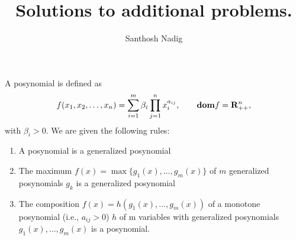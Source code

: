 \documentclass[a4paper,10pt]{article}
\title{Solutions to additional problems.}
\author{Santhosh Nadig}
\def\bR{{\bf R}}
\def\dom{{\bf{dom}}}
\begin{document}
A posynomial is defined as
\begin{align}
f(x_1, x_2,\dots,x_n) = \sum_{i=1}^m \beta_i \prod_{j=1}^n x_i^{a_{ij}}, \qquad \dom f = \bR_{++}^n,
\end{align}
with $\beta_i > 0$.
We are given the following rules:
\begin{enumerate}
\item A posynomial is a generalized posynomial
\item The maximum $f(x) = \max\{ g_1(x),\dots, g_m(x) \}$ of $m$ generalized posynomials $g_k$ is a generalized posynomial
\item The composition $f(x) = h(g_1(x),\dots, g_m(x))$ of a monotone posynomial (i.e., $a_{ij} > 0$) $h$ of m variables with generalized posynomials $g_1(x),\dots, g_m(x)$ is a posynomial.
\end{enumerate}
\end{document}

